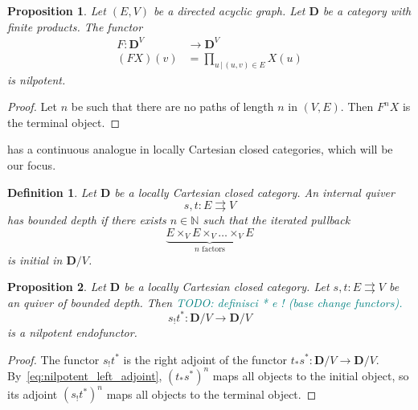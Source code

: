 \documentclass[12pt]{article}
\newtheorem{definition}{Definition}
\newtheorem{proposition}{Proposition}
\newcommand{\pietro}[1]{\textcolor{teal}{#1}}
\newcommand{\N}{{\mathbb{N}}}
\newcommand{\DCat}{{\mathbf{D}}}
\begin{document}
\begin{proposition}\label{prop:graph_architecture}
    Let $(E, V)$ be a directed acyclic graph. Let $\DCat$ be a category with finite products. The functor
    \begin{align*}
        F \colon \DCat^V & \rightarrow \DCat^V                  \\
        (F X)(v)         & = \prod_{u \, | \, (u, v)\in E} X(u)
    \end{align*}
    is nilpotent.
\end{proposition}

\begin{proof}
    Let $n$ be such that there are no paths of length $n$ in $(V, E)$. Then $F^n X$ is the terminal object.
\end{proof}

 has a continuous analogue in locally Cartesian closed categories, which will be our focus.

\begin{definition}\label{def:categorical_architecture}
    Let $\DCat$ be a locally Cartesian closed category. An internal quiver
    \begin{equation*}
        s, t\colon E \rightrightarrows V
    \end{equation*}
    {\em has bounded depth} if there exists $n \in \N$ such that the iterated pullback
    \begin{equation}\label{eq:nilpotent_left_adjoint}
        \underbrace{E \times_V E \times_V \dots \times_V E}_{n \text{ factors}}
    \end{equation}
    is initial in $\DCat/V$.
\end{definition}

\begin{proposition}\label{prop:categorical_architecture}
    Let $\DCat$ be a locally Cartesian closed category. Let $s, t\colon E \rightrightarrows V$ be an quiver of bounded depth. Then \pietro{TODO: definisci * e ! (base change functors).}
    \begin{equation*}
        s_!t^*\colon \DCat/V \rightarrow \DCat/V
    \end{equation*}
    is a nilpotent endofunctor.
\end{proposition}

\begin{proof}
    The functor $s_!t^*$ is the right adjoint of the functor  $t_*s^*\colon \DCat/V \rightarrow \DCat/V$. By~\cref{eq:nilpotent_left_adjoint}, $(t_*s^*)^n$ maps all objects to the initial object, so its adjoint $(s_!t^*)^n$ maps all objects to the terminal object.
\end{proof}
\end{document}
